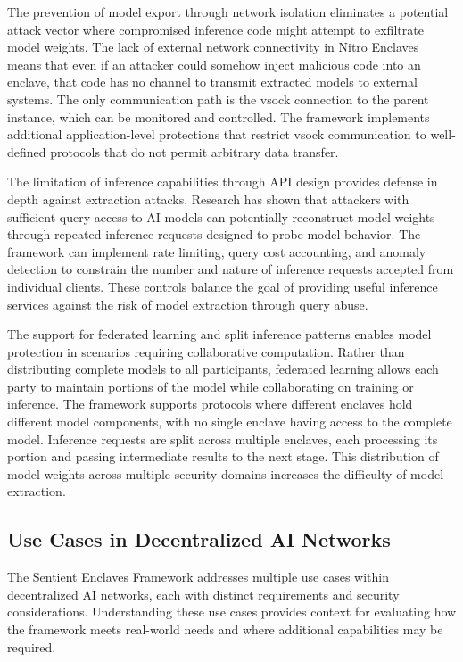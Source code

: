 The prevention of model export through network isolation eliminates a potential attack vector where compromised inference code might attempt to exfiltrate model weights. The lack of external network connectivity in Nitro Enclaves means that even if an attacker could somehow inject malicious code into an enclave, that code has no channel to transmit extracted models to external systems. The only communication path is the vsock connection to the parent instance, which can be monitored and controlled. The framework implements additional application-level protections that restrict vsock communication to well-defined protocols that do not permit arbitrary data transfer.

The limitation of inference capabilities through API design provides defense in depth against extraction attacks. Research has shown that attackers with sufficient query access to AI models can potentially reconstruct model weights through repeated inference requests designed to probe model behavior. The framework can implement rate limiting, query cost accounting, and anomaly detection to constrain the number and nature of inference requests accepted from individual clients. These controls balance the goal of providing useful inference services against the risk of model extraction through query abuse.

The support for federated learning and split inference patterns enables model protection in scenarios requiring collaborative computation. Rather than distributing complete models to all participants, federated learning allows each party to maintain portions of the model while collaborating on training or inference. The framework supports protocols where different enclaves hold different model components, with no single enclave having access to the complete model. Inference requests are split across multiple enclaves, each processing its portion and passing intermediate results to the next stage. This distribution of model weights across multiple security domains increases the difficulty of model extraction.

\subsection{Use Cases in Decentralized AI Networks}

The Sentient Enclaves Framework addresses multiple use cases within decentralized AI networks, each with distinct requirements and security considerations. Understanding these use cases provides context for evaluating how the framework meets real-world needs and where additional capabilities may be required.

